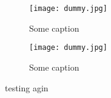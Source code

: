 \begin{figure}[h!]
    \texttt{[image: dummy.jpg]}
    \caption{Some caption}
    \label{fig:some_ref}
\end{figure}

\begin{figure}[h!]
    \texttt{[image: dummy.jpg]}
    \caption{Some caption}
    \label{fig:some_ref}
\end{figure}



 
\twocolumngrid
 
testing agin





